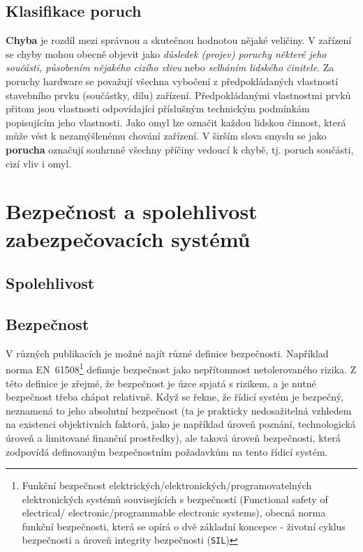 {  \section{Klasifikace poruch}
    \textbf{Chyba} je rozdíl mezi správnou a skutečnou hodnotou nějaké veličiny. V zařízení se 
    chyby mohou obecně objevit jako \emph{důsledek (projev) poruchy některé jeho součásti, 
    působením nějakého cizího vlivu} nebo \emph{selháním lidského činitele}. Za poruchy hardware se 
    považují všechna vybočení z předpokládaných vlastností stavebního prvku (součástky, dílu) 
    zařízení. Předpokládanými vlastnostmi prvků přitom jsou vlastnosti odpovídající příslušným 
    technickým podmínkám popisujícím jeho vlastnosti. Jako omyl lze označit každou lidskou činnost, 
    která může vést k nezamýšlenému chování zařízení. V širším slova smyslu se jako 
    \textbf{porucha} označují souhrnně všechny příčiny vedoucí k chybě, tj. poruch součásti, 
    cizí vliv i omyl.


\setchaptertoc
\chapter{Bezpečnost a spolehlivost zabezpečovacích systémů}
  \section{Spolehlivost}
  \section{Bezpečnost}
    V různých publikacích je možné najít různé definice bezpečnosti. Například norma 
    EN~61508\footnote{Funkční bezpečnost elektrických/elektronických/programovatelných 
    elektronických systémů souvisejících s bezpečností (Functional safety of electrical/ 
    electronic/programmable electronic systems), obecná norma funkční bezpečnosti, která se opírá o 
    dvě základní koncepce - životní cyklus bezpečnosti a úroveň integrity bezpečnosti 
    (\texttt{SIL})} definuje bezpečnost jako nepřítomnost netolerovaného rizika. Z této definice je 
    zřejmé, že bezpečnost je úzce spjatá s rizikem, a je nutné bezpečnost třeba chápat relativně. 
    Když se řekne, že řídicí systém je bezpečný, neznamená to jeho absolutní bezpečnost (ta je 
    prakticky nedosažitelná vzhledem na existenci objektivních faktorů, jako je například úroveň 
    poznání, technologická úroveň a limitované finanční prostředky), ale taková úroveň bezpečnosti, 
    která zodpovídá definovaným bezpečnostním požadavkům na tento řídicí systém. 

}
